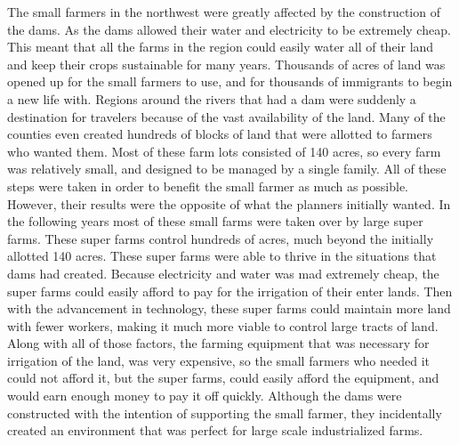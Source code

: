 \documentclass[12pt,twoside]{article}
\begin{document}
\par
The small farmers in the northwest were greatly affected by the construction of the dams. As the dams allowed their water and electricity to be extremely cheap. This meant that all the farms in the region could easily water all of their land and keep their crops sustainable for many years. Thousands of acres of land was opened up for the small farmers to use, and for thousands of immigrants to begin a new life with. Regions around the rivers that had a dam were suddenly a destination for travelers because of the vast availability of the land. Many of the counties even created hundreds of blocks of land that were allotted to farmers who wanted them. Most of these farm lots consisted of 140 acres, so every farm was relatively small, and designed to be managed by a single family. All of these steps were taken in order to benefit the small farmer as much as possible. However, their results were the opposite of what the planners initially wanted. In the following years most of these small farms were taken over by large super farms. These super farms control hundreds of acres, much beyond the initially allotted 140 acres. These super farms were able to thrive in the situations that dams had created. Because electricity and water was mad extremely cheap, the super farms could easily afford to pay for the irrigation of their enter lands. Then with the advancement in technology, these super farms could maintain more land with fewer workers, making it much more viable to control large tracts of land. Along with all of those factors, the farming equipment that was necessary for irrigation of the land, was very expensive, so the small farmers who needed it could not afford it, but the super farms, could easily afford the equipment, and would earn enough money to pay it off quickly. Although the dams were constructed with the intention of supporting the small farmer, they incidentally created an environment that was perfect for large scale industrialized farms. 
\par
\end{document}

